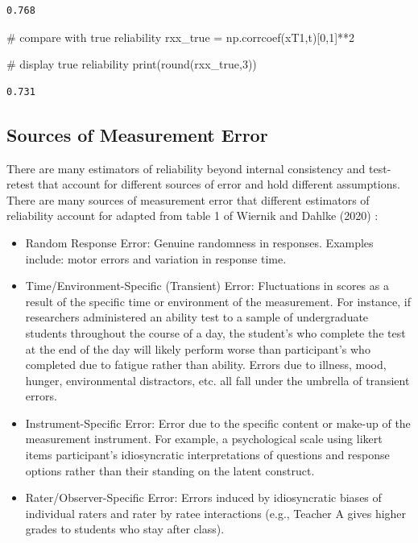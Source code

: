 \documentclass[
  letterpaper,
  DIV=11,
  numbers=noendperiod]{scrreprt}
\newenvironment{Shaded}{\begin{snugshade}}{\end{snugshade}}
\newcommand{\BuiltInTok}[1]{\textcolor[rgb]{0.00,0.23,0.31}{#1}}
\newcommand{\CommentTok}[1]{\textcolor[rgb]{0.37,0.37,0.37}{#1}}
\newcommand{\DecValTok}[1]{\textcolor[rgb]{0.68,0.00,0.00}{#1}}
\newcommand{\NormalTok}[1]{\textcolor[rgb]{0.00,0.23,0.31}{#1}}
\newcommand{\OperatorTok}[1]{\textcolor[rgb]{0.37,0.37,0.37}{#1}}
\begin{document}
\begin{verbatim}
0.768
\end{verbatim}

\begin{Shaded}
\begin{Highlighting}[]
\CommentTok{\# compare with true reliability}
\NormalTok{rxx\_true }\OperatorTok{=}\NormalTok{ np.corrcoef(xT1,t)[}\DecValTok{0}\NormalTok{,}\DecValTok{1}\NormalTok{]}\OperatorTok{**}\DecValTok{2}

\CommentTok{\# display true reliability}
\BuiltInTok{print}\NormalTok{(}\BuiltInTok{round}\NormalTok{(rxx\_true,}\DecValTok{3}\NormalTok{))}
\end{Highlighting}
\end{Shaded}

\begin{verbatim}
0.731
\end{verbatim}

\hypertarget{sources-of-measurement-error}{%
\subsection{Sources of Measurement
Error}\label{sources-of-measurement-error}}

There are many estimators of reliability beyond internal consistency and
test-retest that account for different sources of error and hold
different assumptions. There are many sources of measurement error that
different estimators of reliability account for adapted from table 1 of
Wiernik and Dahlke (2020) :

\begin{itemize}
\item
  Random Response Error: Genuine randomness in responses. Examples
  include: motor errors and variation in response time.
\item
  Time/Environment-Specific (Transient) Error: Fluctuations in scores as
  a result of the specific time or environment of the measurement. For
  instance, if researchers administered an ability test to a sample of
  undergraduate students throughout the course of a day, the student's
  who complete the test at the end of the day will likely perform worse
  than participant's who completed due to fatigue rather than ability.
  Errors due to illness, mood, hunger, environmental distractors, etc.
  all fall under the umbrella of transient errors.
\item
  Instrument-Specific Error: Error due to the specific content or
  make-up of the measurement instrument. For example, a psychological
  scale using likert items participant's idiosyncratic interpretations
  of questions and response options rather than their standing on the
  latent construct.
\item
  Rater/Observer-Specific Error: Errors induced by idiosyncratic biases
  of individual raters and rater by ratee interactions (e.g., Teacher A
  gives higher grades to students who stay after class).
\end{itemize}
\end{document}
